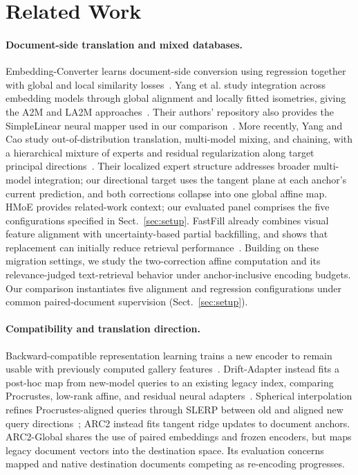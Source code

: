 \section{Related Work}
\label{sec:related}

\paragraph{Document-side translation and mixed databases.}
Embedding-Converter learns document-side conversion using regression together with global and local similarity losses~\cite{embeddingconverter}.
Yang et al. study integration across embedding models through global alignment and locally fitted isometries, giving the A2M and LA2M approaches~\cite{la2m}.
Their authors' repository also provides the SimpleLinear neural mapper used in our comparison~\cite{simplelinear}.
More recently, Yang and Cao study out-of-distribution translation, multi-model mixing, and chaining, with a hierarchical mixture of experts and residual regularization along target principal directions~\cite{yang2026translation}.
Their localized expert structure addresses broader multi-model integration; our directional target uses the tangent plane at each anchor's current prediction, and both corrections collapse into one global affine map.
HMoE provides related-work context; our evaluated panel comprises the five configurations specified in Sect.~\ref{sec:setup}.
FastFill already combines visual feature alignment with uncertainty-based partial backfilling, and shows that replacement can initially reduce retrieval performance~\cite{fastfill2023}.
Building on these migration settings, we study the two-correction affine computation and its relevance-judged text-retrieval behavior under anchor-inclusive encoding budgets.
Our comparison instantiates five alignment and regression configurations under common paired-document supervision (Sect.~\ref{sec:setup}).

\paragraph{Compatibility and translation direction.}
Backward-compatible representation learning trains a new encoder to remain usable with previously computed gallery features~\cite{shen2020backward}.
Drift-Adapter instead fits a post-hoc map from new-model queries to an existing legacy index, comparing Procrustes, low-rank affine, and residual neural adapters~\cite{driftadapter}.
Spherical interpolation refines Procrustes-aligned queries through SLERP between old and aligned new query directions~\cite{spherical2026}; ARC2 instead fits tangent ridge updates to document anchors.
ARC2-Global shares the use of paired embeddings and frozen encoders, but maps legacy document vectors into the destination space.
Its evaluation concerns mapped and native destination documents competing as re-encoding progresses.

